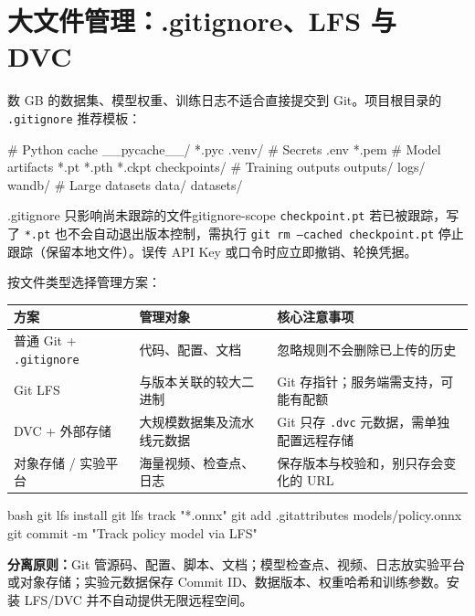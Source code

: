 \documentclass[12pt,a4paper]{ctexart}
\begin{document}
	\section{大文件管理：.gitignore、LFS 与 DVC}

	数 GB 的数据集、模型权重、训练日志不适合直接提交到 Git。项目根目录的 \texttt{.gitignore} 推荐模板：

	\begin{codeblock}{}
# Python cache
__pycache__/
*.pyc
.venv/
# Secrets
.env
*.pem
# Model artifacts
*.pt
*.pth
*.ckpt
checkpoints/
# Training outputs
outputs/
logs/
wandb/
# Large datasets
data/
datasets/
	\end{codeblock}

	\begin{warning}{.gitignore 只影响尚未跟踪的文件}{gitignore-scope}
		\texttt{checkpoint.pt} 若已被跟踪，写了 \texttt{*.pt} 也不会自动退出版本控制，需执行 \texttt{git rm --cached checkpoint.pt} 停止跟踪（保留本地文件）。误传 API Key 或口令时应立即撤销、轮换凭据。
	\end{warning}

	按文件类型选择管理方案：

	\begin{tabularx}{\linewidth}{l X X}
		\toprule
		\textbf{方案} & \textbf{管理对象} & \textbf{核心注意事项} \\
		\midrule
		普通 Git + \texttt{.gitignore} & 代码、配置、文档 & 忽略规则不会删除已上传的历史 \\
		Git LFS & 与版本关联的较大二进制 & Git 存指针；服务端需支持，可能有配额 \\
		DVC + 外部存储 & 大规模数据集及流水线元数据 & Git 只存 \texttt{.dvc} 元数据，需单独配置远程存储 \\
		对象存储 / 实验平台 & 海量视频、检查点、日志 & 保存版本与校验和，别只存会变化的 URL \\
		\bottomrule
	\end{tabularx}

	\begin{codeblock}{bash}
git lfs install
git lfs track "*.onnx"
git add .gitattributes models/policy.onnx
git commit -m "Track policy model via LFS"
	\end{codeblock}

	\textbf{分离原则：}Git 管源码、配置、脚本、文档；模型检查点、视频、日志放实验平台或对象存储；实验元数据保存 Commit ID、数据版本、权重哈希和训练参数。安装 LFS/DVC 并不自动提供无限远程空间。

\end{document}

